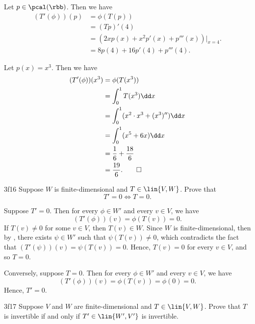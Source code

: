 \begin{solenum}
    \item Let $p \in \pcal(\rbb)$.
	Then we have
    \begin{align*}
        (T'(\phi))(p) &= \phi(T(p)) \\
        &= (Tp)'(4) \\
        &= (2x p(x) + x^2 p'(x) + p'''(x))\big|_{x=4}. \\
        &= 8 p(4) + 16 p'(4) + p'''(4).
    \end{align*}
    \item Let $p(x) = x^3$.
	Then we have
    \begin{align*}
        (T'(\phi))(x^3) &= \phi(T(x^3)) \\
        &= \int_0^1 T(x^3) \dd x \\
        &= \int_0^1 (x^2 \cdot x^3 + (x^3)'') \dd x \\
        &= \int_0^1 (x^5 + 6x) \dd x\\
        &= \frac{1}{6} + \frac{18}{6} \\
        &= \frac{19}{6}. \qedhere
    \end{align*}
\end{solenum}

\begin{exercise}{3f16}
    Suppose $W$ is finite-dimensional and $T \in \lin{V, W}$.
	Prove that
    \[
    	T' = 0 \iff T = 0.
    \]
\end{exercise}

\begin{sol}
    Suppose $T' = 0$.
	Then for every $\phi \in W'$ and every $v \in V$, we have
    \[
    	(T'(\phi))(v) = \phi(T(v)) = 0.
    \]
    If $T(v) \neq 0$ for some $v \in V$, then $T(v) \in W$.
	Since $W$ is finite-dimensional, then by , there exists $\psi \in W'$ such that $\psi(T(v)) \neq 0$, which contradicts the fact that $(T'(\psi))(v) = \psi(T(v)) = 0$.
	Hence, $T(v) = 0$ for every $v \in V$, and so $T = 0$.

    Conversely, suppose $T = 0$.
	Then for every $\phi \in W'$ and every $v \in V$, we have
    \[
    	(T'(\phi))(v) = \phi(T(v)) = \phi(0) = 0.
    \]
    Hence, $T' = 0$.
\end{sol}

\begin{exercise}{3f17}
    Suppose $V$ and $W$ are finite-dimensional and $T \in \lin{V, W}$.
	Prove that $T$ is invertible if and only if $T' \in \lin{W', V'}$ is invertible.
\end{exercise}

